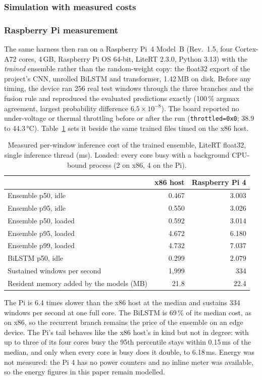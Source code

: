 \subsubsection{Simulation with measured costs}

\subsubsection{Raspberry Pi measurement}
The same harness then ran on a Raspberry Pi~4 Model~B (Rev.~1.5, four Cortex-A72 cores, 4\,GB, Raspberry Pi OS 64-bit, LiteRT 2.3.0, Python 3.13) with the \emph{trained} ensemble rather than the random-weight copy: the float32 export of the project's CNN, unrolled BiLSTM and transformer, 1.42\,MB on disk. Before any timing, the device ran 256 real test windows through the three branches and the fusion rule and reproduced the evaluated predictions exactly (100\,\% argmax agreement, largest probability difference $6.5\times10^{-8}$). The board reported no under-voltage or thermal throttling before or after the run (\texttt{throttled=0x0}; 38.9 to 44.3\,°C). Table~\ref{tab:pi} sets it beside the same trained files timed on the x86 host.

\begin{table}[t]
\caption{Measured per-window inference cost of the trained ensemble, LiteRT float32, single inference thread (ms). Loaded: every core busy with a background CPU-bound process (2 on x86, 4 on the Pi).}
\label{tab:pi}
\centering\footnotesize
\begin{tabular}{@{}lrr@{}}
\toprule
& \textbf{x86 host} & \textbf{Raspberry Pi 4} \\
\midrule
Ensemble p50, idle & 0.467 & 3.003 \\
Ensemble p95, idle & 0.550 & 3.026 \\
Ensemble p50, loaded & 0.592 & 3.014 \\
Ensemble p95, loaded & 4.672 & 6.180 \\
Ensemble p99, loaded & 4.732 & 7.037 \\
BiLSTM p50, idle & 0.299 & 2.079 \\
Sustained windows per second & 1,999 & 334 \\
Resident memory added by the models (MB) & 21.8 & 22.4 \\
\bottomrule
\end{tabular}
\end{table}

\noindent The Pi is 6.4 times slower than the x86 host at the median and sustains 334 windows per second at one full core. The BiLSTM is 69\,\% of its median cost, as on x86, so the recurrent branch remains the price of the ensemble on an edge device. The Pi's tail behaves like the x86 host's in kind but not in degree: with up to three of its four cores busy the 95th percentile stays within 0.15\,ms of the median, and only when every core is busy does it double, to 6.18\,ms. Energy was not measured: the Pi 4 has no power counters and no inline meter was available, so the energy figures in this paper remain modelled.

